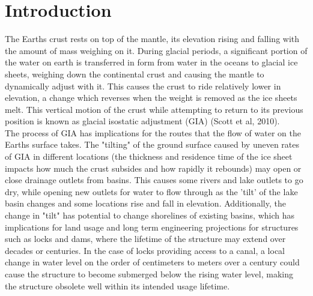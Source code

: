 \documentclass{article}
\begin{document}


\tableofcontents
\newpage


\newpage

\section{Introduction}

 The Earths crust rests on top of the mantle, its elevation rising and falling
 with the amount of mass weighing on it. During glacial periods, a significant portion
 of the water on earth is transferred in form from water in the oceans to glacial ice sheets,
 weighing down the continental crust and causing the mantle to dynamically adjust
 with it. This causes the crust to ride relatively lower in elevation,
 a change which reverses when the weight is removed as the ice sheets melt.
 This vertical motion of the crust while attempting to return to its previous position is known
 as glacial isostatic adjustment (GIA) (Scott et al, 2010).\\
 
 The process of GIA has implications for the routes that the flow
 of water on the Earths surface takes. The "tilting" of the ground surface caused by 
 uneven rates of GIA in different locations (the thickness and residence time of
 the ice sheet impacts how much the crust subsides and how rapidly it rebounds) 
 may open or close drainage outlets from basins. This
 causes some rivers and lake outlets to go dry, while opening new outlets for 
 water to flow through as the 'tilt' of the lake basin changes and some locations
 rise and fall in elevation.
 Additionally, the change in "tilt" has potential to change shorelines of existing
 basins,  which has implications for land usage and long term engineering
 projections for structures such as locks and dams, where the lifetime of
 the structure may extend over decades or centuries. In the case of locks providing
 access to a canal, a local change in water level on the order of centimeters to
 meters over a century could cause the structure to become submerged below the
 rising water level, making the structure obsolete well within its intended usage
 lifetime.\\

\newpage

 
\end{document}
